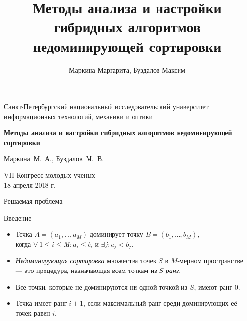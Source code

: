 \documentclass[table]{beamer}
\title[Недоминирующая сортировка]{Методы анализа и настройки гибридных алгоритмов недоминирующей сортировки}
\author[Маркина М., Буздалов М.]{Маркина Маргарита, Буздалов Максим}
\institute[]{Национальный исследовательский университет информационных технологий, механики и оптики}
\date{}
\begin{document}
\begin{frame}
\begin{center}
{\scriptsize Санкт-Петербургский национальный исследовательский университет \\ информационных технологий, механики и оптики}

\vspace{1cm}

\vspace{1cm}

\vbox{\large\bfseries
Методы анализа и настройки гибридных алгоритмов недоминирующей сортировки}

\vspace{1cm}
\vspace{1cm}

{\large Маркина~М.~А., Буздалов~М.~В. \\}

\vspace{1cm}

{\large VII Конгресс молодых ученых \\}
{\large 18 апреля 2018 г. \\}

\end{center}
\end{frame}


\begin{frame}{Решаемая проблема}
\begin{block}{Введение}
\begin{itemize}
\item Точка $A=(a_1,...,a_M)$ доминирует точку $B=(b_1,...,b_M)$, \\
когда $\forall ~ 1 \leq i \leq M : a_i \leq b_i$ и $\exists j : a_j < b_j $.
\item \textit{Недоминирующая сортировка} множества точек $S$ в $M$-мерном пространстве — это процедура, назначающая всем точкам из $S$ \textit{ранг}.
\item Все точки, которые не доминируются ни одной точкой из $S$, имеют ранг 0.
\item Точка имеет ранг $i+1$, если максимальный ранг среди доминирующих  её точек равен $i$.
\end{itemize}
\end{block}
\end{frame}
\end{document}

